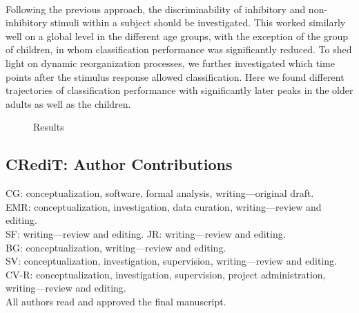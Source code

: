 \\
Following the previous approach, the discriminability of inhibitory and non-inhibitory stimuli within a subject should be investigated. This worked similarly well on a global level in the different age groups, with the exception of the group of children, in whom classification performance was significantly reduced.
To shed light on dynamic reorganization processes, we further investigated which time points after the stimulus response allowed classification. Here we found different trajectories of classification performance with significantly later peaks in the older adults as well as the children. 

\begin{figure}[h]
\begin{center}

\caption[Results]{Results}
\label{fig:results2}
\end{center}
\end{figure}

\subsection*{CRediT: Author Contributions}
CG: conceptualization, software, formal analysis, writing—original draft.\\
EMR: conceptualization, investigation, data curation, writing—review and editing.\\
SF: writing—review and editing. JR: writing—review and editing.\\ 
BG: conceptualization, writing—review and editing.\\ 
SV: conceptualization, investigation, supervision, writing—review and editing.\\ 
CV-R: conceptualization, investigation, supervision, project administration, writing—review and editing.\\ 
All authors read and approved the final manuscript.\\

